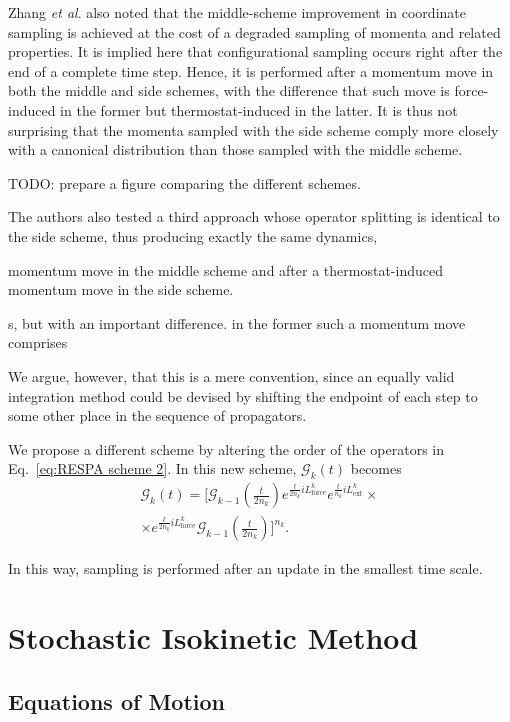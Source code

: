 \documentclass[
    journal=jctcce,
    layout=twocolumn
]{achemso}
\newcommand{\Liu}{i\!L}
\begin{document}
Zhang \textit{et al}. \cite{Zhang_2017} also noted that the middle-scheme improvement in coordinate sampling is achieved at the cost of a degraded sampling of momenta and related properties.
It is implied here that configurational sampling occurs right after the end of a complete time step.
Hence, it is performed after a momentum move in both the middle and side schemes, with the difference that such move is force-induced in the former but thermostat-induced in the latter.
It is thus not surprising that the momenta sampled with the side scheme comply more closely with a canonical distribution than those sampled with the middle scheme.

TODO: prepare a figure comparing the different schemes. 

The authors also tested a third approach whose operator splitting is identical to the side scheme, thus producing exactly the same dynamics, 




momentum move in the middle scheme and after a thermostat-induced momentum move in the side scheme.


s, but with an important difference.
in the former such a momentum move comprises 

We argue, however, that this is a mere convention, since an equally valid integration method could be devised by shifting the endpoint of each step to some other place in the sequence of propagators.

We propose a different scheme by altering the order of the operators in Eq.~\eqref{eq:RESPA scheme 2}.
In this new scheme, $\mathcal{G}_k(t)$ becomes
\begin{multline}
\label{eq:RESPA scheme 2}
\mathcal{G}_k(t) = \Big[\mathcal{G}_{k-1}\left(\tfrac{t}{2n_k}\right)
e^{\frac{t}{2 n_k} \Liu_\mathrm{force}^k}
e^{\frac{t}{n_k} \Liu_\mathrm{ext}^k}
\times \\
\times e^{\frac{t}{2 n_k} \Liu_\mathrm{force}^k}
\mathcal{G}_{k-1}\left(\tfrac{t}{2n_k}\right)
\Big]^{n_k}.
\end{multline}

In this way, sampling is performed after an update in the smallest time scale.

\section{Stochastic Isokinetic Method}

\subsection{Equations of Motion}
\end{document}
